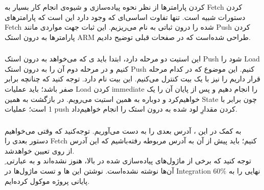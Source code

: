 \subsubsection*{}
کردن پارامترها از نظر نحوه پیاده‌سازی و شیوه‌ی انجام کار بسیار به Fetch کردن دستورات شبیه است. تنها تفاوت اساسی‌ای که وجود دارد این است که پارامترهای Fetch شده را درون ثباتی به نام 
 می‌ریزیم. این ثبات جهت مواردی مانند Push کردن پارامترها به درون استک ARM طراحی شده‌است که در صفحات قبلی توضیح دادیم.

\subsubsection*{}
این استیت دو مرحله دارد، ابتدا باید 
ی
که می‌خواهد به درون استک Push شود را Load کنیم و در مرحله دوم آن را به درون استک Push کنیم. این موضوع که در کدام مرحله قرار داریم را نیز با یک بیت کنترل می‌کنیم. این بیت
نام دارد. توجه کنید که چنانچه
برابر صفر باشد؛ باید عملیات Load کردن immediate را انجام دهیم و پس از پایان آن
را یک خواهیم‌کرد و دوباره به همین استیت می‌رویم. در بازگشت به همین State چون
برابر با 1 است؛ عملیات push کردن مقدارِ لود شده به درون استک را انجام خواهیم‌داد.
\subsubsection*{}
به کمک 
در این 
،
آدرس بعدی را به دست می‌آوریم.
توجه‌کنید که وقتی می‌خواهیم دستور بعدی را Fetch کنیم؛ باید پیش از آن به آدرس مربوطه رفته‌باشیم که این آدرس از روی
تعیین خواهدشد.
\\

توجه کنید که برخی از ماژول‌های پیاده‌سازی شده در بالا، هنوز
نشده‌اند و به عبارتی
ِ
آن‌ها نوشته نشده‌است. نوشتن این 
ها
و تست ماژول‌ها در Integration نهایی را به
$60 \%$
پایانی پروژه موکول کرده‌ایم.
